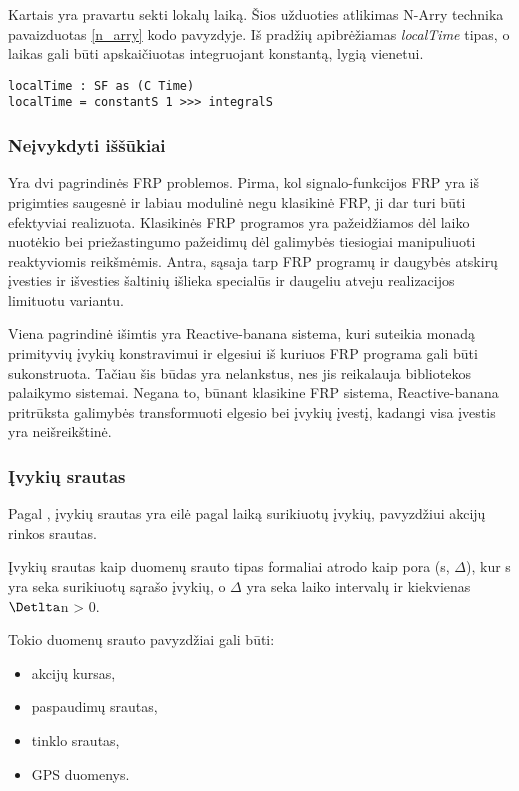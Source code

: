 Kartais yra pravartu sekti lokalų laiką. Šios užduoties atlikimas N-Arry technika pavaizduotas \ref{n_arry} kodo pavyzdyje. Iš pradžių apibrėžiamas \textit{localTime} tipas, o laikas gali būti apskaičiuotas integruojant konstantą, lygią vienetui.

\begin{lstlisting}[caption=- N-Arry demonstracija, label=n_arry]
localTime : SF as (C Time)
localTime = constantS 1 >>> integralS
\end{lstlisting}

\subsubsection{Neįvykdyti iššūkiai}

Yra dvi pagrindinės FRP problemos. Pirma, kol signalo-funkcijos FRP yra iš prigimties saugesnė ir labiau modulinė negu klasikinė FRP, ji dar turi būti efektyviai realizuota. Klasikinės FRP programos yra pažeidžiamos dėl laiko nuotėkio bei priežastingumo pažeidimų dėl galimybės tiesiogiai manipuliuoti reaktyviomis reikšmėmis. Antra, sąsaja tarp FRP programų ir daugybės atskirų įvesties ir išvesties šaltinių išlieka specialūs ir daugeliu atveju realizacijos limituotu variantu.

Viena pagrindinė išimtis yra Reactive-banana sistema, kuri suteikia monadą primityvių įvykių konstravimui ir elgesiui iš kuriuos FRP programa gali būti sukonstruota. Tačiau šis būdas yra nelankstus, nes jis reikalauja bibliotekos palaikymo sistemai. Negana to, būnant klasikine FRP sistema, Reactive-banana pritrūksta galimybės transformuoti elgesio bei įvykių įvestį, kadangi visa įvestis yra neišreikštinė.

\subsubsection{Įvykių srautas}

Pagal \cite{Bass:2007:Mythbusters}, įvykių srautas yra eilė pagal laiką surikiuotų įvykių, pavyzdžiui akcijų rinkos srautas.

Įvykių srautas kaip duomenų srauto tipas formaliai atrodo kaip pora (s, $\Delta$), kur s yra seka surikiuotų sąrašo įvykių, o $\Delta$ yra seka laiko intervalų ir kiekvienas $\Detlta$n > 0.

Tokio duomenų srauto pavyzdžiai gali būti:

\begin{itemize}

	\item akcijų kursas,

	\item paspaudimų srautas,

	\item tinklo srautas,

	\item GPS duomenys.

\end{itemize}

